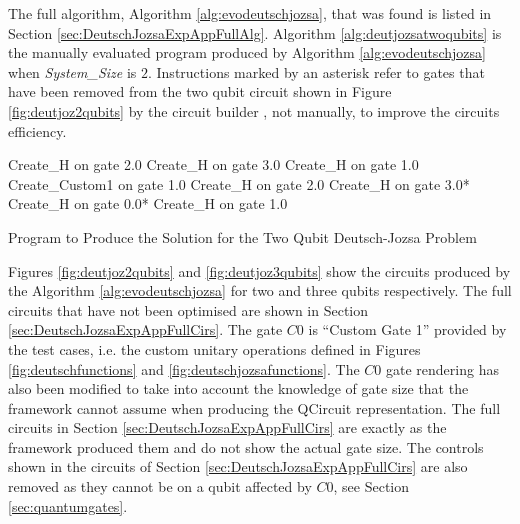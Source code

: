 The full algorithm, Algorithm \ref{alg:evodeutschjozsa}, that was found is listed in Section \ref{sec:DeutschJozsaExpAppFullAlg}.
Algorithm \ref{alg:deutjozsatwoqubits} is the manually evaluated program produced by Algorithm \ref{alg:evodeutschjozsa} when \emph{System\_Size} is $2$.
Instructions marked by an asterisk refer to gates that have been removed from the two qubit circuit shown in Figure \ref{fig:deutjoz2qubits} by the circuit builder , not manually, to improve the circuits efficiency.

\begin{algorithm}
 \begin{algorithmic}
\STATE Create\_H on gate 2.0
\STATE Create\_H on gate 3.0
\STATE Create\_H on gate 1.0
\STATE Create\_Custom1 on gate 1.0
\STATE Create\_H on gate 2.0
\STATE Create\_H on gate 3.0*
\STATE Create\_H on gate 0.0*
\STATE Create\_H on gate 1.0
 \end{algorithmic}
\caption{Program to Produce the Solution for the Two Qubit Deutsch-Jozsa Problem}
\label{alg:deutjozsatwoqubits}
\end{algorithm}


Figures \ref{fig:deutjoz2qubits} and \ref{fig:deutjoz3qubits} show the circuits produced by the Algorithm \ref{alg:evodeutschjozsa} for two and three qubits respectively.
The full circuits that have not been optimised are shown in Section \ref{sec:DeutschJozsaExpAppFullCirs}.
The gate $C0$ is ``Custom Gate 1'' provided by the test cases, i.e. the custom unitary operations defined in Figures \ref{fig:deutschfunctions} and \ref{fig:deutschjozsafunctions}.
The $C0$ gate rendering has also been modified to take into account the knowledge of gate size that the framework cannot assume when producing the QCircuit representation.
The full circuits in Section \ref{sec:DeutschJozsaExpAppFullCirs} are exactly as the framework produced them and do not show the actual gate size.
The controls shown in the circuits of Section \ref{sec:DeutschJozsaExpAppFullCirs} are also removed as they cannot be on a qubit affected by $C0$, see Section \ref{sec:quantumgates}.


